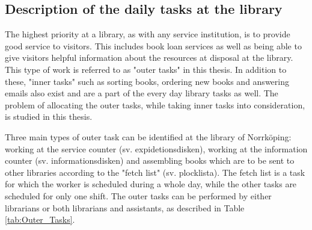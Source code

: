 \subsection{Description of the daily tasks at the library} \label{section:library_tasks}
The highest priority at a library, as with any service institution, is to provide good service to visitors. This includes book loan services as well as being able to give visitors helpful information about the resources at disposal at the library. This type of work is referred to as "outer tasks" in this thesis. In addition to these, "inner tasks" such as sorting books, ordering new books and answering emails also exist and are a part of the every day library tasks as well. The problem of allocating the outer tasks, while taking inner tasks into consideration, is studied in this thesis.

Three main types of outer task can be identified at the library of Norrköping: working at the service counter (sv. expidetionsdisken), working at the information counter (sv. informationsdisken) and assembling books which are to be sent to other libraries according to the "fetch list" (sv. plocklista). The fetch list is a task for which the worker is scheduled during a whole day, while the other tasks are scheduled for only one shift. The outer tasks can be performed by either librarians or both librarians and assistants, as described in Table \ref{tab:Outer_Tasks}.

